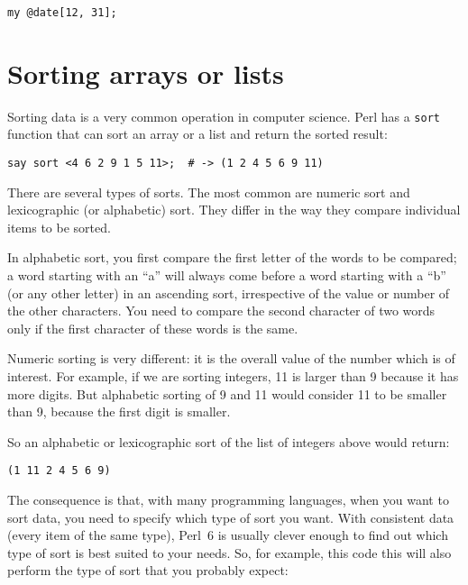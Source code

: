 \begin{verbatim}
my @date[12, 31];
\end{verbatim}


\section{Sorting arrays or lists}
\label{sorting}

Sorting data is a very common operation in computer 
science. Perl has a {\tt sort} function that can sort 
an array or a list and return the sorted result:

\begin{verbatim}
say sort <4 6 2 9 1 5 11>;  # -> (1 2 4 5 6 9 11)
\end{verbatim}

There are several types of sorts. The most common are numeric 
sort and lexicographic (or alphabetic) sort. They differ 
in the way they compare individual items to be sorted. 

In alphabetic sort, you first compare the first letter of 
the words to be compared; a word starting with an ``a'' 
will always come before a word starting with a ``b'' 
(or any other letter) in an ascending sort, irrespective 
of the value or number of the other characters. You need to 
compare the second character of two words only if 
the first character of these words is the same. 

Numeric sorting is very different: it is the overall 
value of the number which is of interest. For example, 
if we are sorting integers, 11 is larger than 9 because 
it has more digits. But alphabetic sorting of 9 and 11 
would consider 11 to be smaller than 9, because the 
first digit is smaller.

So an alphabetic or lexicographic sort of the list of 
integers above would return:

\begin{verbatim}
(1 11 2 4 5 6 9)
\end{verbatim}

The consequence is that, with many programming languages, 
when you want to sort data, you need to specify which 
type of sort you want. With consistent data (every item 
of the same type), Perl~6 is usually clever enough to 
find out which type of sort is best suited to your 
needs. So, for example, this code this will also perform 
the type of sort that you probably expect:

